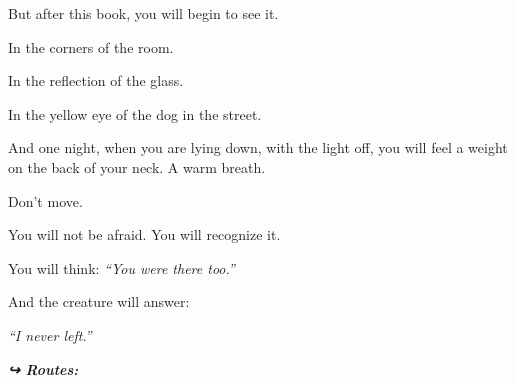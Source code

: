 \noindent But after this book, you will begin to see it.

\noindent In the corners of the room.

\noindent In the reflection of the glass.

\noindent In the yellow eye of the dog in the street.

\noindent And one night, when you are lying down, with the light off, you will feel a weight on the back of your neck. A warm breath.

\noindent Don't move.

\noindent You will not be afraid. You will recognize it.

\noindent You will think: \textit{\textquotedblleft{}You were there too.\textquotedblright{}}

\noindent And the creature will answer:

\noindent \textit{\textquotedblleft{}I never left.\textquotedblright{}}

\vspace{0.5em}
\noindent\textit{\textbf{↪ Routes:}  \rotasep {}}
